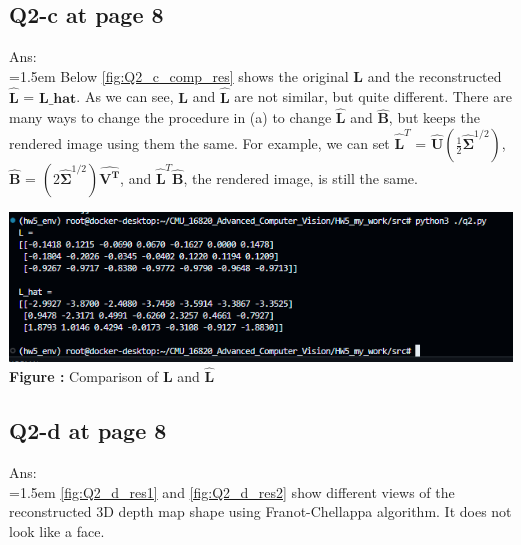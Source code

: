 \documentclass{article}
\begin{document}
	\newpage
	\subsection*{Q2-c at page 8}
	Ans:\\
	\hangindent=1.5em \hspace{1.5em} Below \autoref{fig:Q2_c_comp_res} shows the original $\mathbf{L}$ and the reconstructed $\mathbf{\hat{L}}$ = $\mathbf{L\_hat}$. As we can see, $\mathbf{L}$ and $\mathbf{\hat{L}}$ are not similar, but quite different. There are many ways to change the procedure in (a) to change $\mathbf{\hat{L}}$ and $\mathbf{\hat{B}}$, but keeps the rendered image using them the same. For example, we can set $\hat{\mathbf{L}}^T$ = $\hat{\mathbf{U}}(\frac{1}{2}\hat{\mathbf{\Sigma}}^{1/2})$, $\hat{\mathbf{B}}$ = $(2\hat{\mathbf{\Sigma}}^{1/2})\hat{\mathbf{V^T}}$, and $\hat{\mathbf{L}}^T\hat{\mathbf{B}}$, the rendered image, is still the same.
	\newline

	\begin{minipage}{1\linewidth}
	\centering
	\includegraphics[width=0.8\columnwidth, height=0.3\linewidth]{./Q2_c_comp_res.png}
	  \\%
	\textbf{Figure \thefigure:} Comparison of $\mathbf{L}$ and $\mathbf{\hat{L}}$  %
	\label{fig:Q2_c_comp_res}         %
	\end{minipage}
	
	\newpage
	\subsection*{Q2-d at page 8}
	Ans:\\
	\hangindent=1.5em \hspace{1.5em} \autoref{fig:Q2_d_res1} and \autoref{fig:Q2_d_res2} show different views of the reconstructed 3D depth map shape using Franot-Chellappa algorithm. It does not look like a face.
	\newline
	
\end{document}
